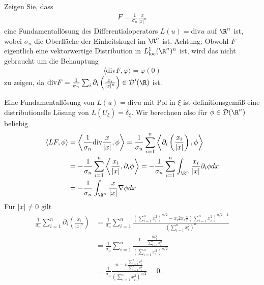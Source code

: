 
\begin{exercise}

Zeigen Sie, dass
\begin{align*}
  F = \frac{1}{\sigma_n}\frac{x}{|x|^n}
\end{align*}
eine Fundamentallösung des Differentialoperators $L(u) = \mathrm{div} u$ auf $\R^n$ ist,
wobei $\sigma_n$ die Oberfläche der Einheitskugel im $\R^n$ ist. Achtung:
Obwohl $F$ eigentlich eine vektorwertige Distribution in $L_{\mathrm{loc}}^1(\R^n)^n$ ist,
wird das nicht gebraucht um die Behauptung
\begin{align*}
  \langle \mathrm{div} F, \varphi \rangle = \varphi(0)
\end{align*}
zu zeigen, da
$\mathrm{div} F = \frac{1}{\sigma_n}\sum_{i}\partial_i\left(\frac{x_i}{|x|^n}\right) \in \mathcal{D}^{\prime}(\R)$
ist.
\end{exercise}


\begin{solution}
Eine Fundamentallösung von $L(u) = \mathrm{div} u$ mit Pol in $\xi$ ist definitionsgemäß
eine distributionelle Lösung von $L(U_{\xi}) = \delta_{\xi}$. Wir berechnen also
für $\phi \in \mathcal{D}(\R^n)$ beliebig
\begin{align*}
  \langle L F, \phi \rangle
  &= \left\langle \frac{1}{\sigma_n}\mathrm{div}\frac{x}{|x|}, \phi \right\rangle
  = \frac{1}{\sigma_n}\sum_{i=1}^n\left\langle \partial_i\left(\frac{x_i}{|x|}\right), \phi \right\rangle \\
  &= -\frac{1}{\sigma_n}\sum_{i=1}^n\left\langle \frac{x_i}{|x|}, \partial_i\phi \right\rangle
  = -\frac{1}{\sigma_n}\sum_{i=1}^n\int_{\R^n}\frac{x_i}{|x|}\partial_i\phi dx  \\
  &= -\frac{1}{\sigma_n}\int_{\R^n}\frac{x}{|x|}\nabla \phi dx  \\
\end{align*}
Für $|x| \neq 0$ gilt
\begin{align*}
  \frac{1}{\sigma_n}\sum_{i=1}^n\partial_i\left(\frac{x_i}{|x|^n}\right)
  &= \frac{1}{\sigma_n}\sum_{i=1}^n\frac{\left(\sum_{i=1}^nx_i^2\right)^{n/2} - x_i2x_i\frac{n}{2}\left(\sum_{i=1}^nx_i^2\right)^{n/2 - 1}}{\left(\sum_{i=1}^nx_i^2\right)^n} \\
  &= \frac{1}{\sigma_n}\sum_{i=1}^n\frac{1 - \frac{nx_i^2}{\sum_{i=1}^nx_i^2}}{\left(\sum_{i=1}^nx_i^2\right)^{n/2}} \\
  &= \frac{1}{\sigma_n}\frac{n - n\frac{\sum_{i=1}^nx_i^2}{\sum_{i=1}^nx_i^2}}{\left(\sum_{i=1}^nx_i^2\right)^{n/2}} = 0.
\end{align*}

\end{solution}

